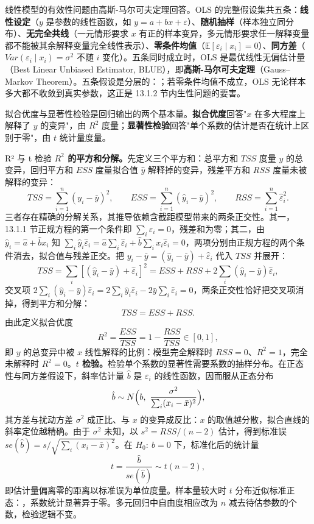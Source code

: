 线性模型的有效性问题由高斯-马尔可夫定理回答。OLS 的完整假设集共五条：\textbf{线性设定}（$y$ 是参数的线性函数，如 $y = a + bx + \varepsilon$）、\textbf{随机抽样}（样本独立同分布）、\textbf{无完全共线}（一元情形要求 $x$ 有正的样本变异，多元情形要求任一解释变量都不能被其余解释变量完全线性表示）、\textbf{零条件均值}（$\mathbb{E}[\varepsilon_i \mid x_i] = 0$）、\textbf{同方差}（$Var(\varepsilon_i \mid x_i) = \sigma^2$ 不随 $i$ 变化）。五条同时成立时，OLS 是最优线性无偏估计量（Best Linear Unbiased Estimator, BLUE），即\textbf{高斯-马尔可夫定理}（Gauss--Markov Theorem）。五条假设是分层的：；若零条件均值不成立，OLS 无论样本多大都不收敛到真实参数，这正是 13.1.2 节内生性问题的要害。

拟合优度与显著性检验是回归输出的两个基本量。\textbf{拟合优度}回答"$x$ 在多大程度上解释了 $y$ 的变异"，由 $R^2$ 度量；\textbf{显著性检验}回答"单个系数的估计是否在统计上区别于零"，由 $t$ 统计量度量。

\begin{derivation}{R² 与 t 检验}{}
\textbf{$R^2$ 的平方和分解。}先定义三个平方和：总平方和 $TSS$ 度量 $y$ 的总变异，回归平方和 $ESS$ 度量拟合值 $\hat y$ 解释掉的变异，残差平方和 $RSS$ 度量未被解释的变异：
\[
TSS = \sum_{i=1}^{n}(y_i - \bar y)^2, \qquad
ESS = \sum_{i=1}^{n}(\hat y_i - \bar y)^2, \qquad
RSS = \sum_{i=1}^{n} \hat\varepsilon_i^2.
\]
三者存在精确的分解关系，其推导依赖含截距模型带来的两条正交性。其一，13.1.1 节正规方程的第一个条件即 $\sum_i \hat\varepsilon_i = 0$，残差和为零；其二，由 $\hat y_i = \hat a + \hat b x_i$ 知 $\sum_i \hat y_i \hat\varepsilon_i = \hat a \sum_i \hat\varepsilon_i + \hat b \sum_i x_i \hat\varepsilon_i = 0$，两项分别由正规方程的两个条件消去，拟合值与残差正交。把 $y_i - \bar y = (\hat y_i - \bar y) + \hat\varepsilon_i$ 代入 $TSS$ 并展开：
\[
TSS = \sum_i [(\hat y_i - \bar y) + \hat\varepsilon_i]^2 = ESS + RSS + 2\sum_i (\hat y_i - \bar y)\hat\varepsilon_i,
\]
交叉项 $2\sum_i (\hat y_i - \bar y)\hat\varepsilon_i = 2\sum_i \hat y_i \hat\varepsilon_i - 2\bar y \sum_i \hat\varepsilon_i = 0$，两条正交性恰好把交叉项消掉，得到平方和分解：
\[
TSS = ESS + RSS.
\]
由此定义拟合优度
\[
R^2 = \frac{ESS}{TSS} = 1 - \frac{RSS}{TSS} \in [0,1],
\]
即 $y$ 的总变异中被 $x$ 线性解释的比例：模型完全解释时 $RSS = 0$、$R^2 = 1$，完全未解释时 $R^2 = 0$。\textbf{$t$ 检验。}检验单个系数的显著性需要系数的抽样分布。在正态性与同方差假设下，斜率估计量 $\hat b$ 是 $\varepsilon_i$ 的线性函数，因而服从正态分布
\[
\hat b \sim N\Bigl(b,\ \frac{\sigma^2}{\sum_i (x_i - \bar x)^2}\Bigr),
\]
其方差与扰动方差 $\sigma^2$ 成正比、与 $x$ 的变异成反比：$x$ 的取值越分散，拟合直线的斜率定位越精确。由于 $\sigma^2$ 未知，以 $s^2 = RSS/(n-2)$ 估计，得到标准误 $se(\hat b) = s / \sqrt{\sum_i (x_i - \bar x)^2}$。在 $H_0:\ b = 0$ 下，标准化后的统计量
\[
t = \frac{\hat b}{se(\hat b)} \sim t(n-2),
\]
即估计量偏离零的距离以标准误为单位度量。样本量较大时 $t$ 分布近似标准正态：，系数统计显著异于零。多元回归中自由度相应改为 $n$ 减去待估参数的个数，检验逻辑不变。
\end{derivation}

